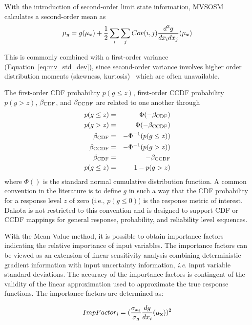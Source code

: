 With the introduction of second-order limit state information, MVSOSM
calculates a second-order mean as
\begin{equation}
\mu_g = g(\mu_{\bf x}) + \frac{1}{2} \sum_i \sum_j Cov(i,j) 
\frac{d^2g}{dx_i dx_j}(\mu_{\bf x}) \label{eq:mv_mean2}
\end{equation}

This is commonly combined with a first-order variance
(Equation~\ref{eq:mv_std_dev}), since second-order variance involves
higher order distribution moments (skewness, kurtosis)~\cite{Hal00}
which are often unavailable.

The first-order CDF probability $p(g \le z)$, first-order 
CCDF probability $p(g > z)$, $\beta_{\rm CDF}$, and $\beta_{\rm CCDF}$ are
related to one another through
\begin{eqnarray}
p(g \le z)  & = & \Phi(-\beta_{\rm CDF})     \label{eq:p_cdf} \\
p(g > z)    & = & \Phi(-\beta_{\rm CCDF})    \label{eq:p_ccdf} \\
\beta_{\rm CDF}  & = & -\Phi^{-1}(p(g \le z)) \label{eq:beta_cdf} \\
\beta_{\rm CCDF} & = & -\Phi^{-1}(p(g > z))   \label{eq:beta_ccdf} \\
\beta_{\rm CDF}  & = & -\beta_{\rm CCDF}       \label{eq:beta_cdf_ccdf} \\
p(g \le z)  & = & 1 - p(g > z)             \label{eq:p_cdf_ccdf}
\end{eqnarray}
where $\Phi()$ is the standard normal cumulative distribution
function.  A common convention in the literature is to define $g$ in
such a way that the CDF probability for a response level $z$ of zero
(i.e., $p(g \le 0)$) is the response metric of interest.  Dakota is
not restricted to this convention and is designed to support CDF or
CCDF mappings for general response, probability, and reliability level
sequences.

With the Mean Value method, it is possible to obtain 
importance factors indicating the relative importance of 
input variables.  The importance factors can be viewed
as an extension of linear sensitivity analysis combining deterministic
gradient information with input uncertainty information,
\emph{i.e}. input variable standard deviations. The accuracy of the
importance factors is contingent of the validity of the linear
approximation used to approximate the true response functions.
The importance factors are determined as: 

\begin{equation}
ImpFactor_i  = ({\frac{\sigma_{x_{i}}}{\sigma_g}}{\frac{dg}{dx_i}(\mu_{\bf x})})^2
\end{equation}


